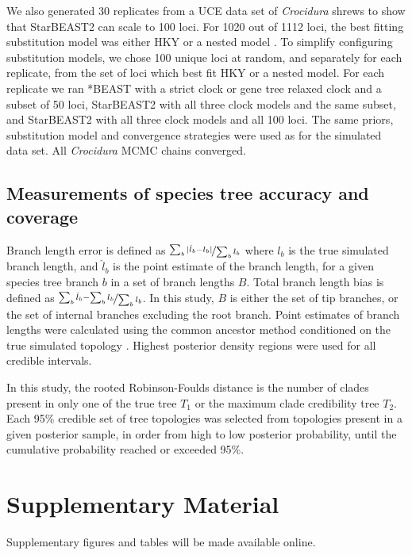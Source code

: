 \documentclass[12pt]{article}
\begin{document}
We also generated 30 replicates from a UCE data set of \textit{Crocidura}
shrews to show that StarBEAST2 can scale to 100 loci. For 1020 out of 1112
loci, the best fitting substitution model was either HKY or a nested model
\citep{Giarla01092015}. To simplify configuring substitution models, we chose
100 unique loci at random, and separately for each replicate, from the set of
loci which best fit HKY or a nested model. For each replicate we ran *BEAST
with a strict clock or gene tree relaxed clock and a subset of 50 loci,
StarBEAST2 with all three clock models and the same subset, and StarBEAST2
with all three clock models and all 100 loci. The same priors, substitution
model and convergence strategies were used as for the simulated data set.
All \textit{Crocidura} MCMC chains converged.

\subsection{Measurements of species tree accuracy and coverage}

Branch length error is defined as $\nicefrac{\sum_b{\lvert\hat{l}_b -
l_b\rvert}}{\sum_b{l_b}}$ where $l_b$ is the true simulated branch length, and
$\hat{l}_b$ is the point estimate of the branch length, for a given species
tree branch $b$ in a set of branch lengths $B$. Total branch length bias is
defined as $\nicefrac{\sum_b{\hat{l}_b} - \sum_b{l_b}}{\sum_b{l_b}}$. In this
study, $B$ is either the set of tip branches, or the set of internal branches
excluding the root branch. Point estimates of branch lengths were calculated
using the common ancestor method conditioned on the true simulated topology
\citep{Heled2013}. Highest posterior density regions were used for all
credible intervals.

In this study, the rooted Robinson-Foulds distance \citep{ROBINSON1981131} is
the number of clades present in only one of the true tree $T_1$ or the maximum
clade credibility tree $T_2$. Each 95\% credible set of tree topologies was
selected from topologies present in a given posterior sample, in order from high
to low posterior probability, until the cumulative probability
reached or exceeded 95\%.

\section{Supplementary Material}

Supplementary figures and tables will be made available online.
\end{document}
